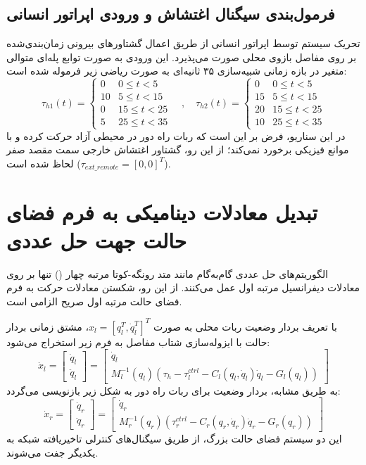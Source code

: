 \documentclass[12pt]{report}
\begin{document}
\subsection{فرمول‌بندی سیگنال اغتشاش و ورودی اپراتور انسانی}
تحریک سیستم توسط اپراتور انسانی از طریق اعمال گشتاورهای بیرونی زمان‌بندی‌شده بر روی مفاصل بازوی محلی صورت می‌پذیرد. این ورودی به صورت توابع پله‌ای متوالی متغیر در بازه زمانی شبیه‌سازی ۳۵ ثانیه‌ای به صورت ریاضی زیر فرموله شده است:
\[ \tau_{h1}(t) = \begin{cases} 0 & 0 \le t < 5 \\ 10 & 5 \le t < 15 \\ 0 & 15 \le t < 25 \\ 5 & 25 \le t < 35 \end{cases} \quad , \quad \tau_{h2}(t) = \begin{cases} 0 & 0 \le t < 5 \\ 15 & 5 \le t < 15 \\ 20 & 15 \le t < 25 \\ 10 & 25 \le t < 35 \end{cases} \]
در این سناریو، فرض بر این است که ربات راه دور در محیطی آزاد حرکت کرده و با موانع فیزیکی برخورد نمی‌کند؛ از این رو، گشتاور اغتشاش خارجی سمت مقصد صفر لحاظ شده است ($\tau_{ext\_remote} = [0, 0]^T$).

\section{تبدیل معادلات دینامیکی به فرم فضای حالت جهت حل عددی}
الگوریتم‌های حل عددی گام‌به‌گام مانند متد رونگه-کوتا مرتبه چهار () تنها بر روی معادلات دیفرانسیل مرتبه اول عمل می‌کنند. از این رو، شکستن معادلات حرکت به فرم فضای حالت مرتبه اول صریح الزامی است.

با تعریف بردار وضعیت ربات محلی به صورت $x_l = [q_l^T, \dot{q}_l^T]^T$، مشتق زمانی بردار حالت با ایزوله‌سازی شتاب مفاصل به فرم زیر استخراج می‌شود:
\[ \dot{x}_l = \begin{bmatrix} \dot{q}_l \\ \ddot{q}_l \end{bmatrix} = \begin{bmatrix} \dot{q}_l \\ M_l^{-1}(q_l) \left( \tau_h - \tau_l^{ctrl} - C_l(q_l, \dot{q}_l)\dot{q}_l - G_l(q_l) \right) \end{bmatrix} \]
به طریق مشابه، بردار وضعیت برای ربات راه دور به شکل زیر بازنویسی می‌گردد:
\[ \dot{x}_r = \begin{bmatrix} \dot{q}_r \\ \ddot{q}_r \end{bmatrix} = \begin{bmatrix} \dot{q}_r \\ M_r^{-1}(q_r) \left( \tau_r^{ctrl} - C_r(q_r, \dot{q}_r)\dot{q}_r - G_r(q_r) \right) \end{bmatrix} \]
این دو سیستم فضای حالت بزرگ، از طریق سیگنال‌های کنترلی تاخیریافته شبکه به یکدیگر جفت می‌شوند.
\end{document}
